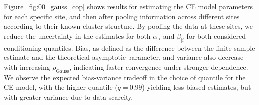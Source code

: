 \documentclass[12pt]{article}
\newcommand{\rhou}[1]{\rho_{\text{#1}}}
\begin{document}

Figure~\ref{fig:00_gauss_cop} shows results for estimating the CE model parameters for each specific site, and then after pooling information across different sites according to their known cluster structure. 
By pooling the data at these sites, we reduce the uncertainty in the estimates for both $\alpha_{\mid i}$ and $\beta_{\mid i}$ for both considered conditioning quantiles. 
Bias, as defined as the difference between the finite-sample estimate and the theoretical asymptotic parameter, and variance also decrease with increasing $\rho_{\text{Gauss}}$, indicating faster convergence under stronger dependence. 
We observe the expected bias-variance tradeoff in the choice of quantile for the CE model, with the higher quantile ($q=0.99$) yielding less biased estimates, but with greater variance due to data scarcity.
\end{document}
